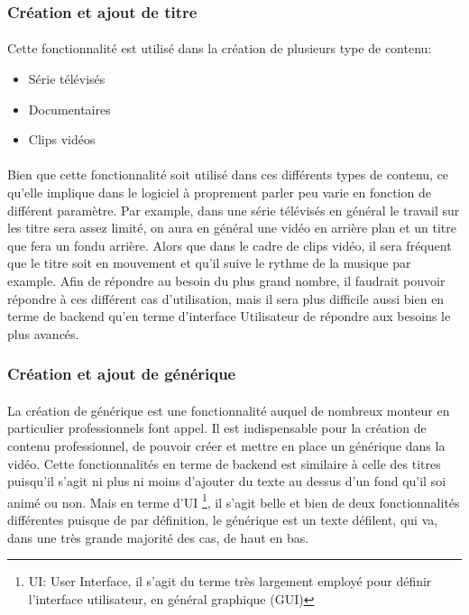     \subsubsection{Création et ajout de titre}
      \paragraph{}
        Cette fonctionnalité est utilisé dans la création de plusieurs type de contenu:
      \begin{itemize}
        \item {Série télévisés}
        \item {Documentaires}
        \item {Clips vidéos}
      \end{itemize}
      \paragraph{}
        Bien que cette fonctionnalité soit utilisé dans ces différents types de contenu,
        ce qu'elle implique dans le logiciel à proprement parler peu varie en fonction
        de différent paramètre. Par example, dans une série télévisés en général le
        travail sur les titre sera assez limité, on aura en général une vidéo en arrière
        plan et un titre que fera un fondu arrière. Alors que dans le cadre de clips vidéo,
        il sera fréquent que le titre soit en mouvement et qu'il suive le rythme de la
        musique par example. Afin de répondre au besoin du plus grand nombre, il faudrait
        pouvoir répondre à ces différent cas d'utilisation, mais il sera plus difficile
        aussi bien en terme de backend qu'en terme d'interface Utilisateur de répondre
        aux besoins le plus avancés.

    \subsubsection{Création et ajout de générique}
      \paragraph{}
        La création de générique est une fonctionnalité auquel de
        nombreux monteur en particulier professionnels font appel. Il est
        indispensable  pour la création de contenu professionnel, de pouvoir
        créer et mettre en place un générique dans la vidéo. Cette
        fonctionnalités en terme de backend est similaire à
        celle des titres puisqu'il s'agit ni plus ni moins d'ajouter du
        texte au dessus d'un fond qu'il soi animé ou non. Mais en terme d'UI
        \footnote{ UI: User Interface, il s'agit du terme  très largement
          employé pour définir l'interface utilisateur, en général graphique (GUI)},
        il s'agit belle et bien de deux fonctionnalités différentes puisque de par
        définition, le générique est un texte défilent, qui va, dans une très grande
        majorité des cas, de haut en bas.


